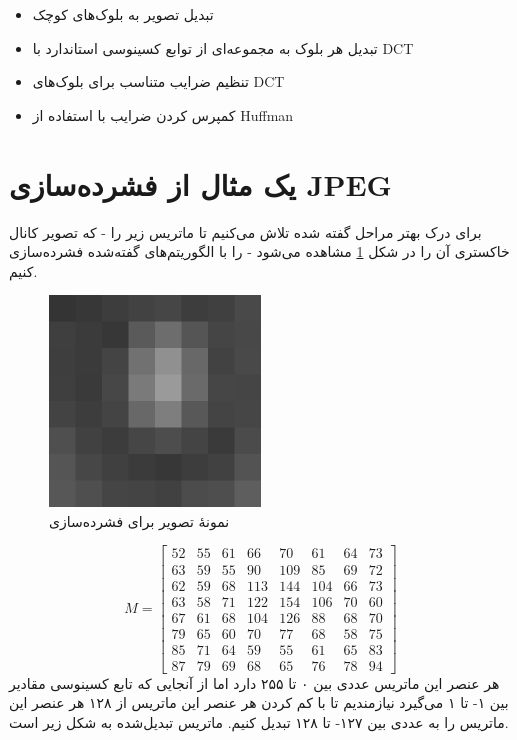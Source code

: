 \begin{itemize}
        \item تبدیل تصویر به بلوک‌های کوچک 
        \item تبدیل هر بلوک به مجموعه‌ای از توابع کسینوسی استاندارد با DCT
        \item تنظیم ضرایب متناسب برای بلوک‌های DCT 
        \item کمپرس کردن ضرایب با استفاده از Huffman
\end{itemize}

\section{یک مثال از فشرده‌سازی JPEG}
برای درک بهتر مراحل گفته شده تلاش می‌کنیم تا ماتریس زیر را - که تصویر کانال خاکستری آن را در شکل 
\ref{jpeg_example}
مشاهده می‌شود -
را با الگوریتم‌های گفته‌شده فشرده‌سازی کنیم.
\begin{figure}[]
        \centering
        \includegraphics[width=0.5\textwidth]{figs/jpeg_block.png}
        \caption{نمونهٔ تصویر برای فشرده‌سازی \cite{jpeg_example}}
        \label{jpeg_example}
\end{figure}
\[
        M = \begin{bmatrix}
                52 & 55 & 61 & 66 & 70 & 61 & 64 & 73\\
                63 & 59 & 55 & 90 & 109 & 85 & 69 & 72 \\
                62 & 59 & 68 & 113 & 144 & 104 & 66 & 73 \\
                63 & 58 & 71 & 122 & 154 & 106 & 70 & 60 \\
                67 & 61 & 68 & 104 & 126 & 88 & 68 & 70 \\
                79 & 65 & 60 & 70 & 77 & 68 & 58 & 75 \\
                85 & 71 & 64 & 59 & 55 & 61 & 65 & 83 \\
                87 & 79 & 69 & 68 & 65 & 76 & 78 & 94 

        \end{bmatrix}
\]
هر عنصر این ماتریس عددی بین ۰ تا ۲۵۵ دارد اما از آنجایی که تابع کسینوسی 
مقادیر بین ۱- تا ۱ می‌گیرد نیازمندیم تا با کم کردن هر عنصر این ماتریس از 
۱۲۸ 
هر عنصر این ماتریس را به عددی بین ۱۲۷- تا ۱۲۸ تبدیل کنیم.
ماتریس تبدیل‌شده به شکل زیر است.

